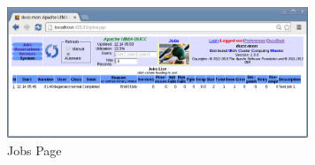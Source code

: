     \begin{figure}[ht!]
    \centering
    \includegraphics[width=90mm]{images/ducc-webserver/Jobs.png}
    \caption{Jobs Page}
    \end{figure}
            
